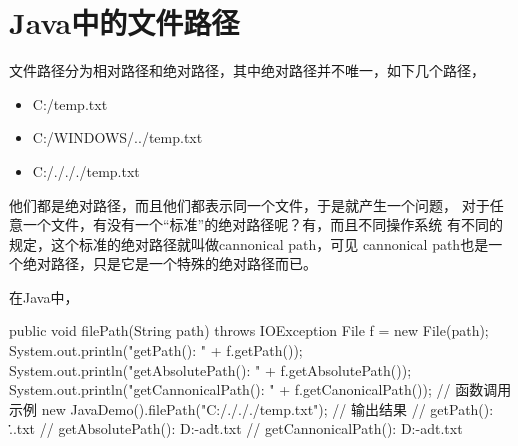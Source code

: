 ﻿\section[Java file path]{Java中的文件路径}
文件路径分为相对路径和绝对路径，其中绝对路径并不唯一，如下几个路径，
\begin{itemize}
  \item C:/temp.txt
  \item C:/WINDOWS/../temp.txt
  \item C:/./././temp.txt
\end{itemize}
他们都是绝对路径，而且他们都表示同一个文件，于是就产生一个问题，
对于任意一个文件，有没有一个“标准”的绝对路径呢？有，而且不同操作系统
有不同的规定，这个标准的绝对路径就叫做cannonical path，可见
cannonical path也是一个绝对路径，只是它是一个特殊的绝对路径而已。

在Java中，

\begin{javacode}
public void filePath(String path) throws IOException {
  File f = new File(path);
  System.out.println("getPath(): " + f.getPath());
  System.out.println("getAbsolutePath(): " + f.getAbsolutePath());
  System.out.println("getCannonicalPath(): " + f.getCanonicalPath());
}
// 函数调用示例
new JavaDemo().filePath("C:/./././temp.txt");
// 输出结果
// getPath(): .\.\.\temp.txt
// getAbsolutePath(): D:\eclipse\workspace-adt\JavaDemo\.\.\.\temp.txt
// getCannonicalPath(): D:\eclipse\workspace-adt\JavaDemo\temp.txt
\end{javacode}
